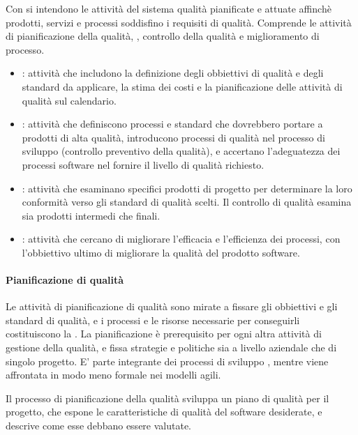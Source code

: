 Con  si intendono le attività del sistema qualità
pianificate e attuate affinchè prodotti, servizi e processi soddisfino i
requisiti di qualità. Comprende le attività di pianificazione della qualità,
, controllo della qualità e miglioramento di
processo.

\begin{itemize}
  \item {}: attività che includono la
    definizione degli obbiettivi di qualità e degli standard da applicare, la
    stima dei costi e la pianificazione delle attività di qualità sul
    calendario.
  \item {}: attività che definiscono processi
    e standard che dovrebbero portare a prodotti di alta qualità, introducono
    processi di qualità nel processo di sviluppo (controllo preventivo della
    qualità), e accertano l'adeguatezza dei processi software nel fornire il
    livello di qualità richiesto.
  \item {}: attività che esaminano specifici
    prodotti di progetto per determinare la loro conformità verso gli standard
    di qualità scelti. Il controllo di qualità esamina sia prodotti intermedi
    che finali.
  \item {}: attività che cercano di migliorare
    l'efficacia e l'efficienza dei processi, con l'obbiettivo ultimo di
    migliorare la qualità del prodotto software.
\end{itemize}

\paragraph{Pianificazione di qualità}

Le attività di pianificazione di qualità sono mirate a fissare gli obbiettivi e
gli standard di qualità, e i processi e le risorse necessarie per conseguirli
costituiscono la . La pianificazione è
prerequisito per ogni altra attività di gestione della qualità, e fissa
strategie e politiche sia a livello aziendale che di singolo progetto. E' parte
integrante dei processi di sviluppo , mentre viene
affrontata in modo meno formale nei modelli agili.

Il processo di pianificazione della qualità sviluppa un piano di qualità per il
progetto, che espone le caratteristiche di qualità del software desiderate, e
descrive come esse debbano essere valutate.

